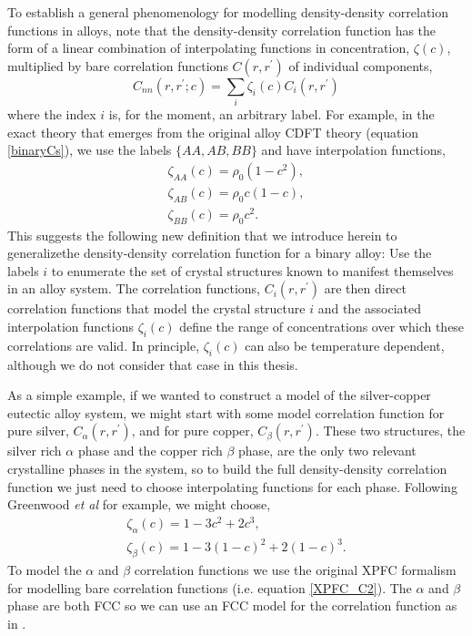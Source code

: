 \documentclass[showkeys, prb, reprint]{revtex4-1}
\begin{document}
To establish a general phenomenology for modelling density-density correlation
functions in alloys, note that the density-density correlation function has the
form of a linear combination of interpolating functions in concentration,
$\zeta(c)$, multiplied by bare correlation functions $C(r, r^\prime)$ of
individual components,
%
\begin{equation}
    C_{nn}(r, r^\prime; c) = \sum_i \zeta_i(c) C_i(r, r^\prime)
\end{equation}
%
where the index $i$ is, for the moment, an arbitrary label. For example, in the
exact theory that emerges from the original alloy CDFT theory (equation
\ref{binaryCs}), we use the labels $\lbrace AA, AB, BB\rbrace$ and have
interpolation functions,
%
\begin{gather}
    \zeta_{AA}(c) = \rho_0 (1 - c^2), \\
    \zeta_{AB}(c) = \rho_0 c (1 - c ), \\
    \zeta_{BB}(c) = \rho_0 c^2.
\end{gather}
%
This suggests the following new definition that we introduce herein to
generalizethe density-density correlation function for a binary alloy: Use the
labels $i$ to enumerate the set of crystal structures known to manifest
themselves in an alloy system. The correlation functions, $C_i(r, r^\prime)$
are then direct correlation functions that model the crystal structure $i$ and
the associated interpolation functions $\zeta_i(c)$ define the range of
concentrations over which these correlations are valid. In principle,
$\zeta_i(c)$ can also be temperature dependent, although we do not consider
that case in this thesis.

As a simple example, if we wanted to construct a model of the silver-copper
eutectic alloy system, we might start with some model correlation function for
pure silver, $C_\alpha(r, r^\prime)$, and for pure copper, $C_\beta(r,
r^\prime)$. These two structures, the silver rich $\alpha$ phase and the copper
rich $\beta$ phase, are the only two relevant crystalline phases in the system,
so to build the full density-density correlation function we just need to
choose interpolating functions for each phase. Following Greenwood \textit{et
al} for example, we might choose,
%
\begin{gather}
    \zeta_\alpha(c) = 1 - 3c^2 + 2c^3, \\
    \zeta_\beta(c) = 1 - 3 (1 - c)^2 + 2(1 - c)^3.
\end{gather}
%
To model the $\alpha$ and $\beta$ correlation functions we use the original
XPFC formalism for modelling bare correlation functions (i.e. equation
\ref{XPFC_C2}). The $\alpha$ and $\beta$ phase are both FCC
\cite{SUBRAMANIAN93} so we can use an FCC model for the correlation function as
in \cite{GREENWOOD10}.
\end{document}
